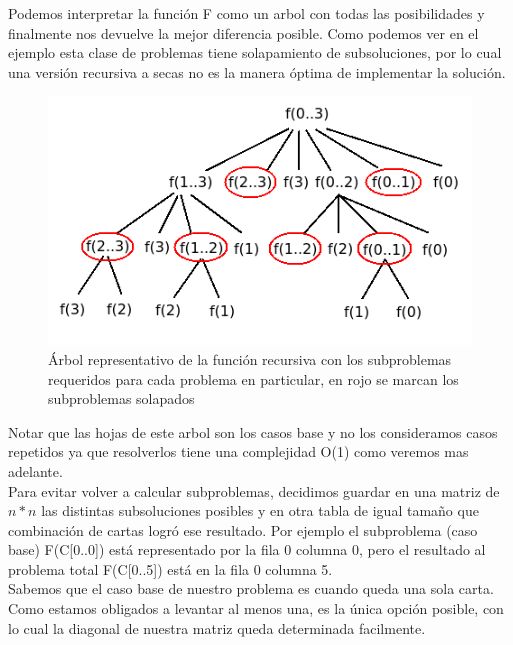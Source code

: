 Podemos interpretar la funci\'on F como un arbol con todas las posibilidades y finalmente nos devuelve la mejor diferencia posible. Como podemos ver en el ejemplo esta clase de problemas tiene solapamiento de subsoluciones, por lo cual una versi\'on recursiva a secas no es la manera \'optima de implementar la soluci\'on. 

\begin{figure}[h]
\begin{center}
\includegraphics[scale=0.6]{./img/ej1_res1.png}
\caption{\'Arbol representativo de la funci\'on recursiva con los subproblemas requeridos para cada problema en particular, en rojo se marcan los subproblemas solapados}
\end{center}
\end{figure}

Notar que las hojas de este arbol son los casos base y no los consideramos casos repetidos ya que resolverlos tiene una complejidad O(1) como veremos mas adelante. \\

Para evitar volver a calcular subproblemas, decidimos guardar en una matriz de $n*n$ las distintas subsoluciones posibles y en otra tabla de igual tama\~no que combinaci\'on de cartas logr\'o ese resultado. Por ejemplo el subproblema (caso base) F(C[0..0]) est\'a representado por la fila 0 columna 0, pero el resultado al problema total F(C[0..5]) est\'a en la fila 0 columna 5.\\

Sabemos que el caso base de nuestro problema es cuando queda una sola carta. Como estamos obligados a levantar al menos una, es la \'unica opci\'on posible, con lo cual la diagonal de nuestra matriz queda determinada facilmente. 

